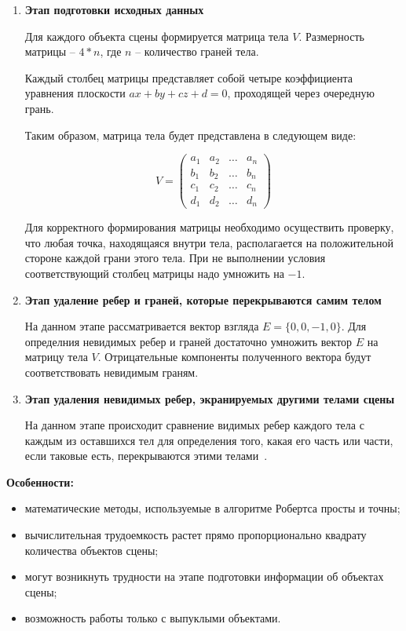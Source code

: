 \begin{enumerate}
	\item \textbf{Этап подготовки исходных данных} 
	
	\setlength{\parindent}{1.25cm}Для каждого объекта сцены формируется матрица тела $V$. 
    Размерность матрицы -- $4 * n$, где $n$ -- количество граней тела.
	
	Каждый столбец матрицы представляет собой четыре коэффициента уравнения плоскости $ax + by + cz + d = 0$, 
    проходящей через очередную грань.

	Таким образом, матрица тела будет представлена в следующем виде:

	\begin{equation}
		V = \begin{pmatrix}
			a_{1} & a_{2} & \ldots & a_{n}\\
			b_{1} & b_{2} & \ldots & b_{n}\\
			c_{1} & c_{2} & \ldots & c_{n}\\
			d_{1} & d_{2} & \ldots & d_{n}
		\end{pmatrix}
	\end{equation}

    Для корректного формирования матрицы необходимо осуществить проверку, что любая точка, находящаяся внутри тела, 
    располагается на положительной стороне каждой грани этого тела. При не выполнении условия соответствующий столбец 
    матрицы надо умножить на $-1$.
    
    \clearpage
    \item \textbf{Этап удаление ребер и граней, которые перекрываются самим телом} 
	
    На данном этапе рассматривается вектор взгляда $E = \{0, 0, -1, 0\}$. Для определния невидимых ребер и граней 
    достаточно умножить вектор $E$ на матрицу тела $V$. Отрицательные компоненты полученного вектора 
    будут соответствовать невидимым граням.

	\item \textbf{Этап удаления невидимых ребер, экранируемых другими телами сцены}
	
    На данном этапе происходит сравнение видимых ребер каждого тела с каждым из оставшихся тел для определения того, какая его
    часть или части, если таковые есть, перекрываются этими телами~\cite{tpu}.

\end{enumerate}

\textbf{Особенности:}
\begin{itemize}
    \item математические методы, используемые в алгоритме Робертса просты и точны;
    \item вычислительная трудоемкость растет прямо пропорционально квадрату количества
    объектов сцены;
    \item могут возникнуть трудности на этапе подготовки информации об объектах сцены;
    \item возможность работы только с выпуклыми объектами.
\end{itemize}

